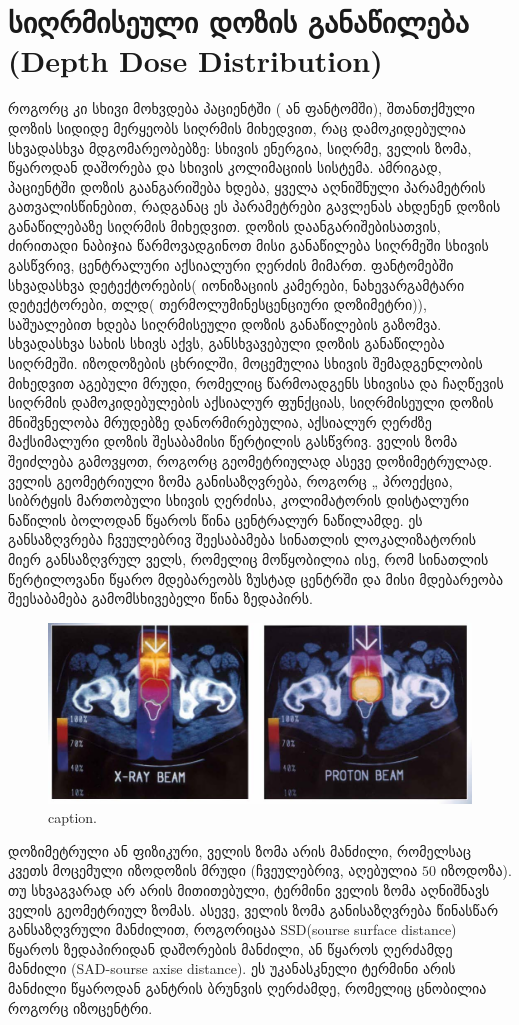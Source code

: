 \documentclass[12pt,a4paper,]{report}
\begin{document}
\section{სიღრმისეული დოზის განაწილება (Depth Dose Distribution)}
როგორც კი სხივი მოხვდება პაციენტში ( ან ფანტომში), შთანთქმული დოზის სიდიდე მერყეობს სიღრმის მიხედვით, რაც დამოკიდებულია სხვადასხვა 
მდგომარეობებზე: სხივის ენერგია, სიღრმე, ველის ზომა, წყაროდან დაშორება და სხივის კოლიმაციის სისტემა. ამრიგად, პაციენტში დოზის გაანგარიშება ხდება, ყველა აღნიშნული პარამეტრის გათვალისწინებით, რადგანაც ეს პარამეტრები გავლენას ახდენენ დოზის განაწილებაზე სიღრმის მიხედვით. დოზის დაანგარიშებისათვის, ძირითადი ნაბიჯია წარმოვადგინოთ მისი განაწილება სიღრმეში სხივის გასწვრივ, ცენტრალური აქსიალური ღერძის მიმართ. 
ფანტომებში სხვადასხვა დეტექტორების( იონიზაციის კამერები, ნახევარგამტარი დეტექტორები, თლდ( თერმოლუმინესცენციური დოზიმეტრი)),  საშუალებით ხდება სიღრმისეული დოზის განაწილების გაზომვა. სხვადასხვა სახის სხივს აქვს, განსხვავებული დოზის განაწილება სიღრმეში. იზოდოზების ცხრილში, მოცემულია სხივის შემადგენლობის მიხედვით აგებული მრუდი, რომელიც წარმოადგენს სხივისა და ჩაღწევის სიღრმის დამოკიდებულების 
აქსიალურ ფუნქციას, სიღრმისეული დოზის მნიშვნელობა მრუდებზე დანორმირებულია, აქსიალურ ღერძზე მაქსიმალური დოზის შესაბამისი წერტილის გასწვრივ. ველის ზომა შეიძლება გამოვყოთ, როგორც გეომეტრიულად ასევე დოზიმეტრულად. ველის გეომეტრიული ზომა განისაზღვრება, როგორც „ პროექცია, სიბრტყის მართობული სხივის ღერძისა, კოლიმატორის დისტალური ნაწილის ბოლოდან წყაროს წინა ცენტრალურ ნაწილამდე. ეს განსაზღვრება ჩვეულებრივ შეესაბამება სინათლის ლოკალიზატორის მიერ განსაზღვრულ ველს, რომელიც მოწყობილია ისე, რომ სინათლის წერტილოვანი წყარო მდებარეობს ზუსტად ცენტრში და მისი მდებარეობა შეესაბამება გამომსხივებელი წინა ზედაპირს. 
	\begin{figure}[h]
	    \centering
        \includegraphics[width = 15cm]{images/depth_dose_distribution_01}
        \caption{caption.}
    \end{figure}
დოზიმეტრული ან ფიზიკური, ველის ზომა არის მანძილი, რომელსაც კვეთს მოცემული იზოდოზის მრუდი (ჩვეულებრივ, აღებულია $50$ იზოდოზა). 
თუ სხვაგვარად არ არის მითითებული, ტერმინი ველის ზომა აღნიშნავს ველის გეომეტრიულ ზომას. ასევე, ველის ზომა განისაზღვრება წინასწარ განსაზღვრული მანძილით, როგორიცაა SSD(sourse surface distance) წყაროს ზედაპირიდან დაშორების მანძილი, ან წყაროს ღერძამდე მანძილი (SAD-sourse axise distance). ეს უკანასკნელი ტერმინი არის მანძილი წყაროდან განტრის ბრუნვის ღერძამდე, რომელიც ცნობილია როგორც იზოცენტრი. 
\end{document}
